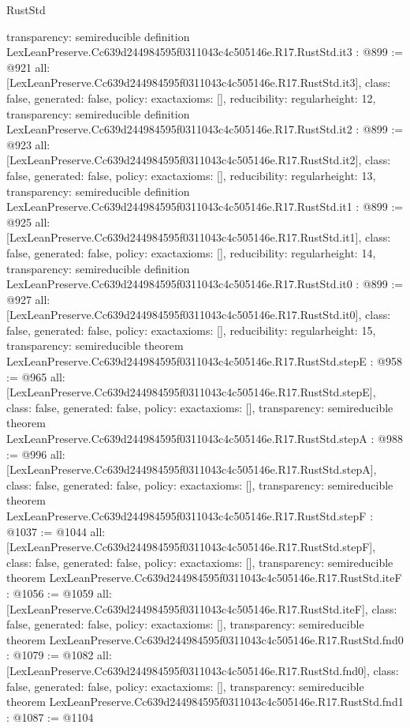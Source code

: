 \begin{lexlean}{RustStd}
\begin{coremodule}
{  transparency: semireducible
}
definition LexLeanPreserve.Cc639d244984595f0311043c4c505146e.R17.RustStd.it3 : @899 := @921 {
  all: [LexLeanPreserve.Cc639d244984595f0311043c4c505146e.R17.RustStd.it3],
  class: false,
  generated: false,
  policy: exact{axioms: []},
  reducibility: regular{height: 12},
  transparency: semireducible
}
definition LexLeanPreserve.Cc639d244984595f0311043c4c505146e.R17.RustStd.it2 : @899 := @923 {
  all: [LexLeanPreserve.Cc639d244984595f0311043c4c505146e.R17.RustStd.it2],
  class: false,
  generated: false,
  policy: exact{axioms: []},
  reducibility: regular{height: 13},
  transparency: semireducible
}
definition LexLeanPreserve.Cc639d244984595f0311043c4c505146e.R17.RustStd.it1 : @899 := @925 {
  all: [LexLeanPreserve.Cc639d244984595f0311043c4c505146e.R17.RustStd.it1],
  class: false,
  generated: false,
  policy: exact{axioms: []},
  reducibility: regular{height: 14},
  transparency: semireducible
}
definition LexLeanPreserve.Cc639d244984595f0311043c4c505146e.R17.RustStd.it0 : @899 := @927 {
  all: [LexLeanPreserve.Cc639d244984595f0311043c4c505146e.R17.RustStd.it0],
  class: false,
  generated: false,
  policy: exact{axioms: []},
  reducibility: regular{height: 15},
  transparency: semireducible
}
theorem LexLeanPreserve.Cc639d244984595f0311043c4c505146e.R17.RustStd.stepE : @958 := @965 {
  all: [LexLeanPreserve.Cc639d244984595f0311043c4c505146e.R17.RustStd.stepE],
  class: false,
  generated: false,
  policy: exact{axioms: []},
  transparency: semireducible
}
theorem LexLeanPreserve.Cc639d244984595f0311043c4c505146e.R17.RustStd.stepA : @988 := @996 {
  all: [LexLeanPreserve.Cc639d244984595f0311043c4c505146e.R17.RustStd.stepA],
  class: false,
  generated: false,
  policy: exact{axioms: []},
  transparency: semireducible
}
theorem LexLeanPreserve.Cc639d244984595f0311043c4c505146e.R17.RustStd.stepF : @1037 := @1044 {
  all: [LexLeanPreserve.Cc639d244984595f0311043c4c505146e.R17.RustStd.stepF],
  class: false,
  generated: false,
  policy: exact{axioms: []},
  transparency: semireducible
}
theorem LexLeanPreserve.Cc639d244984595f0311043c4c505146e.R17.RustStd.iteF : @1056 := @1059 {
  all: [LexLeanPreserve.Cc639d244984595f0311043c4c505146e.R17.RustStd.iteF],
  class: false,
  generated: false,
  policy: exact{axioms: []},
  transparency: semireducible
}
theorem LexLeanPreserve.Cc639d244984595f0311043c4c505146e.R17.RustStd.fnd0 : @1079 := @1082 {
  all: [LexLeanPreserve.Cc639d244984595f0311043c4c505146e.R17.RustStd.fnd0],
  class: false,
  generated: false,
  policy: exact{axioms: []},
  transparency: semireducible
}
theorem LexLeanPreserve.Cc639d244984595f0311043c4c505146e.R17.RustStd.fnd1 : @1087 := @1104 {
}
\end{coremodule}
\end{lexlean}
